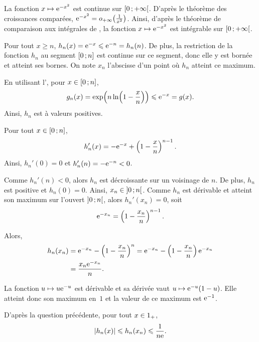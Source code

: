 \begin{solution}
\begin{reponses}
\item La fonction $x \mapsto \mathrm{e}^{-x^2}$ est continue sur $\left[0\,;+\infty\right[$. D'après le théorème des croissances comparées, \mbox{$\mathrm{e}^{-x^2} = o_{+\infty}\mathopen{}\left(\frac{1}{x^2}\right)$}. Ainsi, d'après le théorème de comparaison aux intégrales de , la fonction $x \mapsto \mathrm{e}^{-x^2}$ est intégrable sur $\left[0\,;+\infty\right[$.

\item
\begin{reponses}
\item Pour tout $x \geqslant n$, $h_n(x) = \mathrm{e}^{-x} \leqslant \mathrm{e}^{-n} = h_n(n)$. De plus, la restriction de la fonction $h_n$ au segment $\left[0\,;n\right]$ est continue sur ce segment, donc elle y est bornée et atteint ses bornes. On note $x_n$ l'abscisse d'un point où $h_n$ atteint ce maximum.

\item En utilisant l', pour $x \in \left[0\,;n\right]$,
\[
g_n(x)
= \exp\mathopen{}\left(n \ln\mathopen{}\left(1 - \frac{x}{n}\right)\right)
\leqslant \mathrm{e}^{-x} = g(x).
\]
Ainsi, $h_n$ est à valeurs positives.

\item Pour tout $x \in \left[0\,;n\right]$,
\[
h_n'(x) = -\mathrm{e}^{-x} + \left(1 - \frac{x}{n}\right)^{n-1}.
\]
Ainsi, $h_n'(0) = 0$ et $h_n'(n) = - \mathrm{e}^{-n} < 0$.

Comme $h_n'(n) < 0$, alors $h_n$ est décroissante sur un voisinage de $n$. De plus, $h_n$ est positive et $h_n(0) = 0$. Ainsi, $x_n \in \left]0\,;n\right[$. Comme $h_n$ est dérivable et atteint son maximum sur l'ouvert $\left]0\,;n\right[$, alors $h_n'(x_n) = 0$, soit
\[
\mathrm{e}^{-x_n} = \left(1 - \frac{x_n}{n}\right)^{n-1}.
\]

Alors,
\begin{align*}
h_n(x_n)
&= \mathrm{e}^{-x_n} - \left(1 - \frac{x_n}{n}\right)^n
= \mathrm{e}^{-x_n} - \left(1 - \frac{x_n}{n}\right) \mathrm{e}^{-x_n}\\
&= \frac{x_n \mathrm{e}^{-x_n}}{n}.
\end{align*}

\item La fonction $u \mapsto u \mathrm{e}^{-u}$ est dérivable et sa dérivée vaut $u \mapsto \mathrm{e}^{-u} (1 - u)$. Elle atteint donc son maximum en~$1$ et la valeur de ce maximum est $\mathrm{e}^{-1}$.

D'après la question précédente, pour tout $x \in 1_+$,
\begin{align*}
\left| h_n(x) \right|
\leqslant h_n(x_n)
\leqslant \frac{1}{n \mathrm{e}}.
\end{align*}


\end{reponses}
\end{reponses}
\end{solution}

